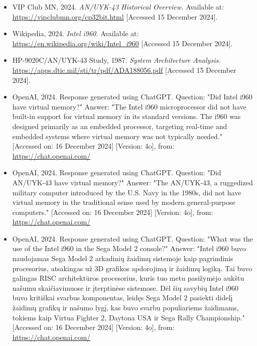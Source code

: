 \documentclass{article}
\begin{document}
\begin{itemize}
\item VIP Club MN, 2024. \textit{AN/UYK-43 Historical Overview.} Available at: \url{https://vipclubmn.org/cp32bit.html} [Accessed 15 December 2024].

\item Wikipedia, 2024. \textit{Intel i960.} Available at: \url{https://en.wikipedia.org/wiki/Intel_i960} [Accessed 15 December 2024].

\item HP-9020C/AN/UYK-43 Study, 1987. \textit{System Architecture Analysis.} \url{https://apps.dtic.mil/sti/tr/pdf/ADA188056.pdf} [Accessed 15 December 2024].

\item OpenAI, 2024. Response generated using ChatGPT. Question: "Did Intel i960 have virtual memory?" Answer: "The Intel i960 microprocessor did not have built-in support for virtual memory in its standard versions. The i960 was designed primarily as an embedded processor, targeting real-time and embedded systems where virtual memory was not typically needed." [Accessed on: 16 December 2024] [Version: 4o], from: \url{https://chat.openai.com/}

\item OpenAI, 2024. Response generated using ChatGPT. Question: "Did AN/UYK-43 have virtual memory?" Answer: "The AN/UYK-43, a ruggedized military computer introduced by the U.S. Navy in the 1980s, did not have virtual memory in the traditional sense used by modern general-purpose computers." [Accessed on: 16 December 2024] [Version: 4o], from: \url{https://chat.openai.com/}

\item OpenAI, 2024. Response generated using ChatGPT. Question: "What was the use of the Intel i960 in the Sega Model 2 console?" Answer: "Intel i960 buvo naudojamas Sega Model 2 arkadinių žaidimų sistemoje kaip pagrindinis procesorius, atsakingas už 3D grafikos apdorojimą ir žaidimų logiką. Tai buvo galingas RISC architektūros procesorius, kuris tuo metu pasižymėjo aukštu našumu skaičiavimuose ir įterptinėse sistemose. Dėl šių savybių Intel i960 buvo kritiškai svarbus komponentas, leidęs Sega Model 2 pasiekti didelį žaidimų grafikų ir našumo lygį, kas buvo svarbu populiariems žaidimams, tokiems kaip Virtua Fighter 2, Daytona USA ir Sega Rally Championship." [Accessed on: 16 December 2024] [Version: 4o], from: \url{https://chat.openai.com/}

\end{itemize}
\end{document}
